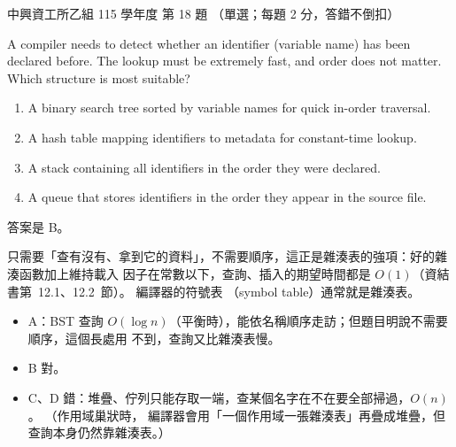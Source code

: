 \begin{pastexam}[label={px:nchu-115-is-18}]{中興資工所乙組 115 學年度 第 18 題}
（單選；每題 2 分，答錯不倒扣）

A compiler needs to detect whether an identifier (variable name) has been declared before. The
lookup must be extremely fast, and order does not matter. Which structure is most suitable?
\begin{enumerate}[label=\Alph*.,nosep]
\item A binary search tree sorted by variable names for quick in-order traversal.
\item A hash table mapping identifiers to metadata for constant-time lookup.
\item A stack containing all identifiers in the order they were declared.
\item A queue that stores identifiers in the order they appear in the source file.
\end{enumerate}
\end{pastexam}

\begin{pastsoln}
答案是 B。

只需要「查有沒有、拿到它的資料」，不需要順序，這正是雜湊表的強項：好的雜湊函數加上維持載入
因子在常數以下，查詢、插入的期望時間都是 $O(1)$（資結書第~12.1、12.2~節）。 編譯器的符號表
（symbol table）通常就是雜湊表。
\begin{itemize}
\item A：BST 查詢 $O(\log n)$（平衡時），能依名稱順序走訪；但題目明說不需要順序，這個長處用
不到，查詢又比雜湊表慢。
\item B 對。
\item C、D 錯：堆疊、佇列只能存取一端，查某個名字在不在要全部掃過，$O(n)$。 （作用域巢狀時，
編譯器會用「一個作用域一張雜湊表」再疊成堆疊，但查詢本身仍然靠雜湊表。）
\end{itemize}
\end{pastsoln}

